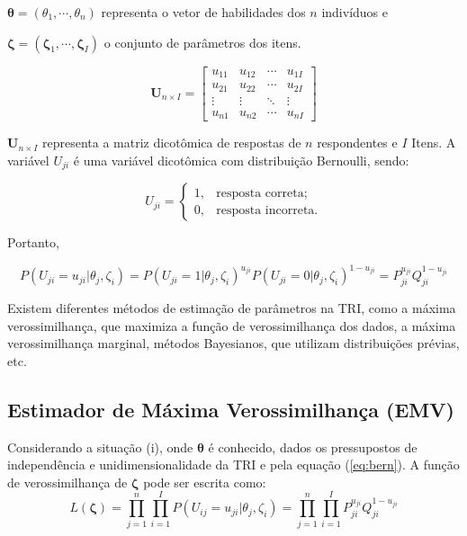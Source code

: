 \noindent $ \boldsymbol{\theta} = (\theta_1, \cdots, \theta_n) $  representa o vetor de habilidades dos $n$ indivíduos e

\noindent $ \boldsymbol{\zeta} = (\boldsymbol{\zeta}_1, \cdots, \boldsymbol{\zeta}_I) $ o conjunto de parâmetros dos itens.

\[ \textbf{U}_{n\times I} =  
\begin{bmatrix}
	u_{11} & u_{12} & \cdots & u_{1I} \\
	u_{21} & u_{22} & \cdots & u_{2I} \\
	\vdots & \vdots & \ddots & \vdots\\
	u_{n1} & u_{n2} & \cdots & u_{nI}
\end{bmatrix}
\]

\noindent $\textbf{U}_{n\times I}$ representa a matriz dicotômica de respostas de $ n $ respondentes e $ I $ Itens. A variável $U_{ji}$ é uma variável dicotômica com distribuição Bernoulli, sendo:

\[U_{ji} =    \begin{cases}
	
	  1, & \mbox{resposta correta;}  \\
	
	  0, & \mbox{resposta incorreta.}
	
\end{cases}
\]

Portanto,  

\begin{equation} \label{eq:bern}
P(U_{ji} = u_{ji}|\theta_j, \zeta_i) = P(U_{ji} = 1|\theta_j, \zeta_i)^{u_{ji}}
P(U_{ji} = 0|\theta_j, \zeta_i)^{1 - u_{ji}} = P_{ji}^{u_{ji}}Q_{ji}^{1-u_{ji}}
\end{equation}

Existem diferentes métodos de estimação de parâmetros na TRI, como a máxima verossimilhança, que maximiza a função de verossimilhança dos dados, a máxima verossimilhança marginal, métodos Bayesianos, que utilizam distribuições prévias, etc.

\subsection{Estimador de Máxima Verossimilhança (EMV)}

Considerando a situação (i), onde $ \boldsymbol{\theta} $ é conhecido, dados os pressupostos de independência e unidimensionalidade da TRI e pela equação (\ref{eq:bern}). A função de verossimilhança de  $ \boldsymbol{\zeta} $ pode ser escrita como:
\[
L(\boldsymbol{\zeta}) =  \prod_{j=1}^{n}\prod_{i=1}^{I}P(U_{ij} = u_{ji}|\theta_j, \zeta_i) = \prod_{j=1}^{n}\prod_{i=1}^{I}P_{ji}^{u_{ji}}Q_{ji}^{1-u_{ji}}
\]

